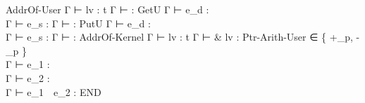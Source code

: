 {{               {}
    }
    {AddrOf-User}{ 
                 { Γ ⊢ lv : t }
                 { Γ ⊢  :  }
    }
    {GetU}{ 
              { Γ ⊢ e_d : 
             \\ Γ ⊢ e_s : 
              }
              { Γ ⊢  : \tInt }
    }
    {PutU}{ 
              { Γ ⊢ e_d : 
             \\ Γ ⊢ e_s : 
              }
              { Γ ⊢  : \tInt }
    }
    {AddrOf-Kernel}{ 
                       { Γ ⊢ lv : t }
                       { Γ ⊢ \& lv :  }
    }
    {Ptr-Arith-User}{ 
                         { \opbin ∈ \{ +_p, -_p \} \\
                           Γ ⊢ e_1 :  \\
                           Γ ⊢ e_2 : \tInt \\
                         }
                         { Γ ⊢ e_1~\opbin~e_2 :  }
    }
    {END}
}


